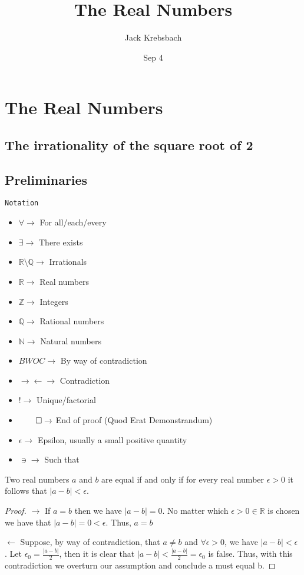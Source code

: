 \documentclass{report}
\title{The Real Numbers}
\author{Jack Krebsbach }
\date{Sep 4}
\begin{document}
\maketitle

\section{The Real Numbers}

\subsection{The irrationality of the square root of 2 }

\subsection{Preliminaries}

\texttt{Notation}
\begin{multicols}{2}
\begin{itemize}
  \item $\forall \rightarrow$ For all/each/every
  \item $\exists \rightarrow$ There exists
  \item $\mathbb{R} \setminus \mathbb{Q} \rightarrow$ Irrationals
  \item $\mathbb{R} \rightarrow$ Real numbers
  \item $\mathbb{Z} \rightarrow$ Integers
  \item $\mathbb{Q} \rightarrow$ Rational numbers
  \item $\mathbb{N} \rightarrow$ Natural numbers
  \item $BWOC \rightarrow$ By way of contradiction
  \item $\rightarrow\!\leftarrow \rightarrow$ Contradiction
  \item $! \rightarrow$ Unique/factorial
  \item $\qed \rightarrow$ End of proof (Quod Erat Demonstrandum)
  \item $\epsilon \rightarrow$ Epsilon, usually a small positive quantity
  \item $\ni \rightarrow$ Such that
\end{itemize}
\end{multicols}

 Two real numbers $a$ and $b$ are equal if and only if for every real number $\epsilon > 0$ it follows that $|a-b| < \epsilon.$ 

\begin{proof}

  \par
  $\rightarrow$
  If $a=b$ then we have $|a-b| =0$. No matter which  $\epsilon >  0 \in \mathbb{R}$ is chosen we have that  $|a-b|=0 < \epsilon.$ Thus, $a=b$  \par
$\leftarrow$
Suppose, by way of contradiction, that $a\neq b$ and $\forall \epsilon > 0$, we have $|a-b| < \epsilon$ . Let $\epsilon_{0} = \frac{|a-b|}{2}$, then it is clear that $|a-b| < \frac{|a-b|}{2} = \epsilon_{0}$ is false. Thus, with this contradiction we overturn our assumption and conclude a must equal b.
\end{proof}
\end{document}
